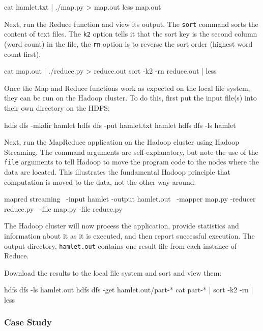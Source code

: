 \begin{bashcode}
cat hamlet.txt | ./map.py > map.out
less map.out
\end{bashcode}

Next, run the Reduce function and view its output. The \texttt{sort} command sorts the content of text files. The \texttt{k2} option tells it that the sort key is the second column (word count) in the file, the \texttt{rn} option is to reverse the sort order (highest word count first).

\begin{bashcode}
cat map.out | ./reduce.py > reduce.out
sort -k2 -rn reduce.out | less
\end{bashcode}

Once the Map and Reduce functions work as expected on the local file system, they can be run on the Hadoop cluster. To do this, first put the input file(s) into their own directory on the HDFS:

\begin{bashcode}
hdfs dfs -mkdir hamlet
hdfs dfs -put hamlet.txt hamlet
hdfs dfs -ls hamlet
\end{bashcode}

Next, run the MapReduce application on the Hadoop cluster using Hadoop Streaming. The command arguments are self-explanatory, but note the use of the \texttt{file} arguments to tell Hadoop to move the program code to the nodes where the data are located. This illustrates the fundamental Hadoop principle that computation is moved to the data, not the other way around.

\begin{bashcode}
mapred streaming \
  -input hamlet -output hamlet.out \
  -mapper map.py -reducer reduce.py \
  -file map.py -file reduce.py
\end{bashcode}

The Hadoop cluster will now process the application, provide statistics and information about it as it is executed, and then report successful execution. The output directory, \texttt{hamlet.out} contains one result file from each instance of Reduce. 

Download the results to the local file system and sort and view them:

\begin{bashcode}
hdfs dfs -ls hamlet.out
hdfs dfs -get hamlet.out/part-*
cat part-* | sort -k2 -rn | less
\end{bashcode}

\newpage
\subsubsection*{Case Study}

